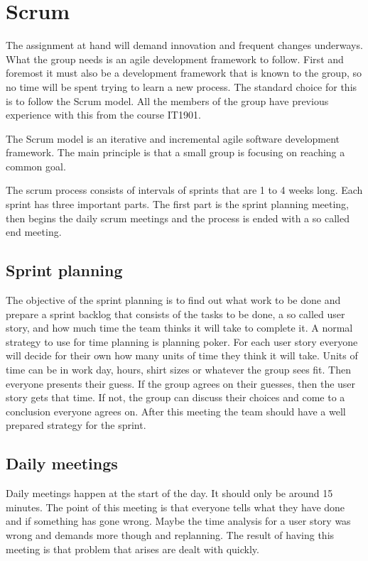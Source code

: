 \section{Scrum}

The assignment at hand will demand innovation and frequent changes underways.
What the group needs is an agile development framework to follow. First and foremost it must also be a development framework that is known to the group, 
so no time will be spent trying to learn a new process.
The standard choice for this is to follow the Scrum model. All the members of the group have previous experience with this from the course IT1901.

The Scrum model is an iterative and incremental agile software development framework.
The main principle is that a small group is focusing on reaching a common goal.

The scrum process consists of intervals of sprints that are 1 to 4 weeks long. Each sprint has three important parts.
The first part is the sprint planning meeting, then begins the daily scrum meetings and the process is ended with a so called end meeting.

\subsection{Sprint planning}
The objective of the sprint planning is to find out what work to be done and prepare a
sprint backlog that consists of the tasks to be done, a so called user story, and how much time the team thinks it will take to complete it. A normal strategy to use for time planning is
planning poker. For each user story everyone will decide for their own how many units of time they think it will take. Units of time can be in work day, hours, shirt sizes or whatever the group sees fit. 
Then everyone presents their guess. If the group agrees on their guesses, then the user story gets that time. If not, the group can discuss their choices and come to a conclusion everyone agrees on.
After this meeting the team should have a well prepared strategy for the sprint.

\subsection{Daily meetings}
Daily meetings happen at the start of the day. It should only be around 15 minutes. The point of this meeting is that everyone tells what they have done and if something has gone wrong.
Maybe the time analysis for a user story was wrong and demands more though and replanning. The result of having this meeting is that problem that arises are dealt with quickly.

